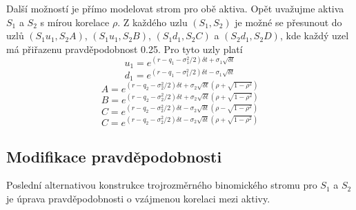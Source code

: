 \documentclass[a4paper]{book}
\begin{document}
Další možností je přímo modelovat strom pro obě aktiva. Opět uvažujme aktiva $S_1$ a $S_2$ s mírou korelace $\rho$. Z každého uzlu $(S_1, S_2)$ je možné se přesunout do uzlů $(S_1u_1,S_2A)$, $(S_1u_1,S_2B)$, $(S_1d_1,S_2C)$ a $(S_2d_1, S_2D)$, kde každý uzel má přiřazenu pravděpodobnost 0.25. Pro tyto uzly platí
\begin{equation*}
u_1 = e^{(r-q_1-\sigma^2_1/2)\delta t + \sigma_1 \sqrt{\delta t}}
\end{equation*}
\begin{equation*}
d_1 = e^{(r-q_1-\sigma^2_1/2)\delta t - \sigma_1 \sqrt{\delta t}}
\end{equation*}
\begin{equation*}
A = e^{(r-q_2-\sigma^2_2/2)\delta t + \sigma_2\sqrt{\delta t}(\rho+\sqrt{1-\rho^2})}
\end{equation*}
\begin{equation*}
B = e^{(r-q_2-\sigma^2_2/2)\delta t + \sigma_2\sqrt{\delta t}(\rho+\sqrt{1-\rho^2})}
\end{equation*}
\begin{equation*}
C = e^{(r-q_2-\sigma^2_2/2)\delta t - \sigma_2\sqrt{\delta t}(\rho-\sqrt{1-\rho^2})}
\end{equation*}
\begin{equation*}
C = e^{(r-q_2-\sigma^2_2/2)\delta t - \sigma_2\sqrt{\delta t}(\rho+\sqrt{1-\rho^2})}
\end{equation*}

\subsection{Modifikace pravděpodobnosti}

Poslední alternativou konstrukce trojrozměrného binomického stromu pro $S_1$ a $S_2$ je úprava pravděpodobnosti o vzájmenou korelaci mezi aktivy.
\end{document}
